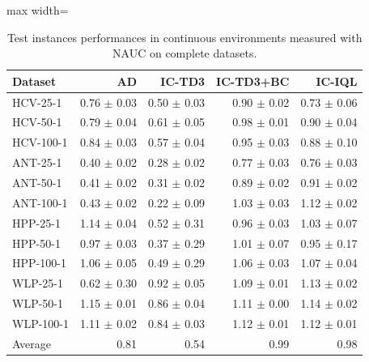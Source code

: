 \documentclass{article}
\begin{document}
\begin{table}[ht]
    \label{tab:}
    \begin{center}
    \caption{Test instances performances in continuous environments measured with NAUC on complete datasets.}
    \begin{small}
    \begin{adjustbox}{max width=\columnwidth}
		\begin{tabular}{l|rrrr}
		\toprule
	\textbf{Dataset} & \textbf{AD} & \textbf{IC-TD3} & \textbf{IC-TD3+BC} & \textbf{IC-IQL}\\
\midrule
HCV-25-1 & 0.76 $\pm$ 0.03 & 0.50 $\pm$ 0.03 & 0.90 $\pm$ 0.02 & 0.73 $\pm$ 0.06\\
HCV-50-1 & 0.79 $\pm$ 0.04 & 0.61 $\pm$ 0.05 & 0.98 $\pm$ 0.01 & 0.90 $\pm$ 0.04\\
HCV-100-1 & 0.84 $\pm$ 0.03 & 0.57 $\pm$ 0.04 & 0.95 $\pm$ 0.03 & 0.88 $\pm$ 0.10\\
ANT-25-1 & 0.40 $\pm$ 0.02 & 0.28 $\pm$ 0.02 & 0.77 $\pm$ 0.03 & 0.76 $\pm$ 0.03\\
ANT-50-1 & 0.41 $\pm$ 0.02 & 0.31 $\pm$ 0.02 & 0.89 $\pm$ 0.02 & 0.91 $\pm$ 0.02\\
ANT-100-1 & 0.43 $\pm$ 0.02 & 0.22 $\pm$ 0.09 & 1.03 $\pm$ 0.03 & 1.12 $\pm$ 0.02\\
HPP-25-1 & 1.14 $\pm$ 0.04 & 0.52 $\pm$ 0.31 & 0.96 $\pm$ 0.03 & 1.03 $\pm$ 0.07\\
HPP-50-1 & 0.97 $\pm$ 0.03 & 0.37 $\pm$ 0.29 & 1.01 $\pm$ 0.07 & 0.95 $\pm$ 0.17\\
HPP-100-1 & 1.06 $\pm$ 0.05 & 0.49 $\pm$ 0.29 & 1.06 $\pm$ 0.03 & 1.07 $\pm$ 0.04\\
WLP-25-1 & 0.62 $\pm$ 0.30 & 0.92 $\pm$ 0.05 & 1.09 $\pm$ 0.01 & 1.13 $\pm$ 0.02\\
WLP-50-1 & 1.15 $\pm$ 0.01 & 0.86 $\pm$ 0.04 & 1.11 $\pm$ 0.00 & 1.14 $\pm$ 0.02\\
WLP-100-1 & 1.11 $\pm$ 0.02 & 0.84 $\pm$ 0.03 & 1.12 $\pm$ 0.01 & 1.12 $\pm$ 0.01\\
\midrule
Average & 0.81 & 0.54 & 0.99 & 0.98\\
\end{tabular}
        \end{adjustbox}
    \end{small}
    \end{center}
    \vskip -0.1in
\end{table}
\FloatBarrier
\end{document}
